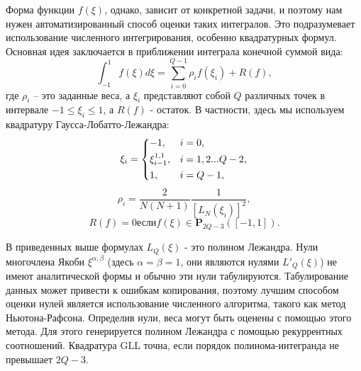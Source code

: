 Форма функции $f(\xi)$, однако, зависит от конкретной задачи, и поэтому нам нужен автоматизированный способ оценки таких интегралов. 
%
Это подразумевает использование численного интегрирования, особенно квадратурных формул.
%
Основная идея заключается в приближении интеграла конечной суммой вида:
%
%
\begin{equation*}
    \int^1_{-1} f(\xi) d\xi = \sum^{Q-1}_{i=0}\rho_i f(\xi_i) + R(f),
\end{equation*}
%
где $\rho_i$ -- это заданные веса, а $\xi_i$ представляют собой $Q$ различных точек в интервале $−1 \leq \xi_i \leq 1$, а $R(f)$ - остаток. 
%
В частности, здесь мы используем квадратуру Гаусса-Лобатто-Лежандра:
%
\begin{equation*}
\xi_i= 
\begin{dcases}
    -1,              & i=0,\\
    \xi^{1,1}_{i-1}, & i = 1,2...Q-2,\\
    1,               & i = Q-1,
\end{dcases}
\end{equation*}
%
\begin{equation*}
    \rho_i = \frac{2}{N(N+1)}\frac{1}{[L_N(\xi_i)]^2},
\end{equation*}
%
%
\begin{equation*}
    R(f) = 0 \text{если} f(\xi) \in \textbf{P}_{2Q-3}([-1,1]).
\end{equation*}
%

В приведенных выше формулах $L_Q(\xi)$ - это полином Лежандра. 
%
Нули многочлена Якоби $\xi^{\alpha,\beta}$ (здесь $\alpha = \beta = 1$, 
они являются нулями $L'_Q(\xi)$) не имеют аналитической формы и обычно эти нули табулируются. 
%
Табулирование данных может привести к ошибкам копирования, 
поэтому лучшим способом оценки нулей является использование численного алгоритма, 
такого как метод Ньютона-Рафсона. 
%
Определив нули, веса могут быть оценены с помощью этого метода.
%
Для этого генерируется полином Лежандра с помощью рекуррентных соотношений. 
%
Квадратура GLL точна, если порядок полинома-интегранда не превышает $2Q - 3$.
%

